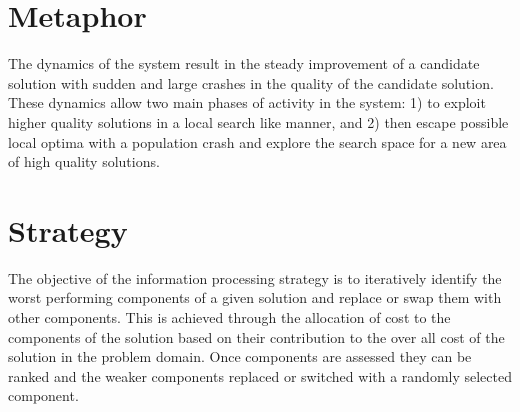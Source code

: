 \documentclass[a4paper, 11pt]{article}
\begin{document}
\section{Metaphor}
\label{sec:metaphor}
The dynamics of the system result in the steady improvement of a candidate solution with sudden and large crashes in the quality of the candidate solution. These dynamics allow two main phases of activity in the system: 1) to exploit higher quality solutions in a local search like manner, and 2) then escape possible local optima with a population crash and explore the search space for a new area of high quality solutions.

\section{Strategy}
\label{sec:strategy}
The objective of the information processing strategy is to iteratively identify the worst performing components of a given solution and replace or swap them with other components.
This is achieved through the allocation of cost to the components of the solution based on their contribution to the over all cost of the solution in the problem domain. Once components are assessed they can be ranked and the weaker components replaced or switched with a randomly selected component. 
\end{document}
